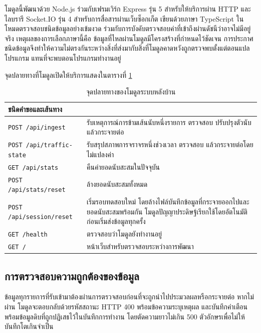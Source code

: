 โมดูลนี้พัฒนาด้วย Node.js ร่วมกับเฟรมเวิร์ก Express รุ่น 5 สำหรับให้บริการผ่าน HTTP และไลบรารี Socket.IO รุ่น 4 สำหรับการสื่อสารผ่านเว็บซ็อกเก็ต เขียนด้วยภาษา TypeScript ในโหมดตรวจสอบชนิดข้อมูลอย่างเข้มงวด ร่วมกับการบังคับตรวจสอบค่าที่เข้าถึงผ่านดัชนีว่าอาจไม่มีอยู่จริง  เหตุผลของการเลือกภาษานี้คือ ข้อมูลที่ไหลผ่านโมดูลมีโครงสร้างที่กำหนดไว้ชัดเจน การประกาศชนิดข้อมูลจึงทำให้ความไม่ตรงกันระหว่างสิ่งที่ส่งมากับสิ่งที่โมดูลคาดหวังถูกตรวจพบตั้งแต่ตอนแปลโปรแกรม แทนที่จะพบตอนโปรแกรมทำงานอยู่

จุดปลายทางที่โมดูลเปิดให้บริการแสดงในตารางที่ \ref{tab:endpoints}

\begin{table}[ht]
    \caption{จุดปลายทางของโมดูลระบบหลังบ้าน}
    \label{tab:endpoints}
    \centering
    \footnotesize
    \begin{tabular}{|l|>{\raggedright\arraybackslash}p{92mm}|}
        \hline
        \textbf{ชนิดคำขอและเส้นทาง} & \multicolumn{1}{c|}{\textbf{หน้าที่}} \\
        \hline
        \texttt{POST /api/ingest} & รับเหตุการณ์การข้ามเส้นนับหนึ่งรายการ ตรวจสอบ ปรับปรุงตัวนับ แล้วกระจายต่อ \\
        \hline
        \texttt{POST /api/traffic-state} & รับสรุปสภาพการจราจรหนึ่งช่วงเวลา ตรวจสอบ แล้วกระจายต่อโดยไม่แปลงค่า \\
        \hline
        \texttt{GET /api/stats} & คืนค่ายอดนับสะสมในปัจจุบัน \\
        \hline
        \texttt{POST /api/stats/reset} & ล้างยอดนับสะสมทั้งหมด \\
        \hline
        \texttt{POST /api/session/reset} & เริ่มรอบทดสอบใหม่ โดยล้างไฟล์บันทึกข้อมูลที่กระจายออกไปและยอดนับสะสมพร้อมกัน โมดูลปัญญาประดิษฐ์เรียกใช้โดยอัตโนมัติก่อนเริ่มส่งข้อมูลทุกครั้ง \\
        \hline
        \texttt{GET /health} & ตรวจสอบว่าโมดูลยังทำงานอยู่ \\
        \hline
        \texttt{GET /} & หน้าเว็บสำหรับตรวจสอบระหว่างการพัฒนา \\
        \hline
    \end{tabular}
\end{table}

\subsection{การตรวจสอบความถูกต้องของข้อมูล}
\label{subsec:validation}

ข้อมูลทุกรายการที่รับเข้ามาต้องผ่านการตรวจสอบก่อนที่จะถูกนำไปประมวลผลหรือกระจายต่อ หากไม่ผ่าน โมดูลจะตอบกลับด้วยรหัสสถานะ HTTP 400 พร้อมข้อความระบุเหตุผล และบันทึกคำเตือนพร้อมข้อมูลดิบที่ถูกปฏิเสธไว้ในบันทึกการทำงาน โดยตัดความยาวไม่เกิน 500 ตัวอักษรเพื่อไม่ให้บันทึกโตเกินจำเป็น

